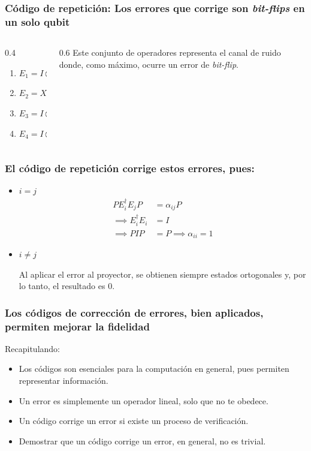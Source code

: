 \documentclass[english,9pt]{Linnaeus}
\begin{document}
    \begin{frame}[allowframebreaks]
      \frametitle{Código de repetición: Los errores que corrige son \textit{bit-flips} en un solo qubit}

      \begin{columns}
        \begin{column}{0.4\textwidth}
          \begin{enumerate}
            \item $E_1 = I \otimes I \otimes I$
            \item $E_2 = X \otimes I \otimes I$
            \item $E_3 = I \otimes X \otimes I$
            \item $E_4 = I \otimes I \otimes X$
          \end{enumerate}
        \end{column}

        \begin{column}{0.6\textwidth}
          Este conjunto de operadores representa el canal de ruido donde, como máximo, ocurre un error de \textit{bit-flip}.
        \end{column}
      \end{columns}
    \end{frame}

    \begin{frame}[allowframebreaks]
      \frametitle{El código de repetición corrige estos errores, pues:}
      \begin{itemize}
        \item $i = j$
          \begin{align*}
            PE^\dagger_iE_jP &= \alpha_{ij}P\\
            \implies E^\dagger_iE_i &= I \\
            \implies PIP &= P \implies \alpha_{ii} = 1
          \end{align*}

        \item $i \neq j$

          Al aplicar el error al proyector, se obtienen siempre estados ortogonales y, por lo tanto, el resultado es 0.

      \end{itemize}
    \end{frame}

    \begin{frame}[allowframebreaks]
      \frametitle{Los códigos de corrección de errores, bien aplicados, permiten mejorar la fidelidad}
      Recapitulando:
      \begin{itemize}
        \item Los códigos son esenciales para la computación en general, pues permiten representar información.
        \item Un error es simplemente un operador lineal, solo que no te obedece.
        \item Un código corrige un error si existe un proceso de verificación.
        \item Demostrar que un código corrige un error, en general, no es trivial.
      \end{itemize}
    \end{frame}
\end{document}
